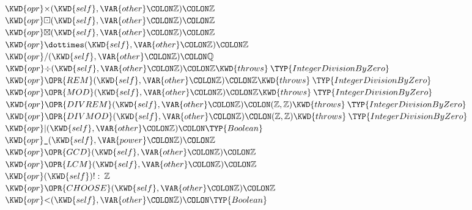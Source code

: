 \begin{Fortress}
\(  \KWD{opr} \mathord{\times}(\KWD{self}, \VAR{other}\COLON \mathbb{Z})\COLON \mathbb{Z}\)\\
\(  \KWD{opr} \mathord{\boxdot}(\KWD{self}, \VAR{other}\COLON \mathbb{Z})\COLON \mathbb{Z}\)\\
\(  \KWD{opr} \mathord{\boxtimes}(\KWD{self}, \VAR{other}\COLON \mathbb{Z})\COLON \mathbb{Z}\)\\
\(  \KWD{opr} \mathord{\dottimes}(\KWD{self}, \VAR{other}\COLON \mathbb{Z})\COLON \mathbb{Z}\)\\
\(  \KWD{opr} /(\KWD{self}, \VAR{other}\COLON \mathbb{Z})\COLON \mathbb{Q}\)\\
\(  \KWD{opr} \mathord{\div}(\KWD{self}, \VAR{other}\COLON \mathbb{Z})\COLON \mathbb{Z} \KWD{throws}\mskip 4mu plus 4mu\TYP{IntegerDivisionByZero}\)\\
\(  \KWD{opr} \mathord{\OPR{REM}}(\KWD{self}, \VAR{other}\COLON \mathbb{Z})\COLON \mathbb{Z} \KWD{throws}\mskip 4mu plus 4mu\TYP{IntegerDivisionByZero}\)\\
\(  \KWD{opr} \mathord{\OPR{MOD}}(\KWD{self}, \VAR{other}\COLON \mathbb{Z})\COLON \mathbb{Z} \KWD{throws}\mskip 4mu plus 4mu\TYP{IntegerDivisionByZero}\)\\
\(  \KWD{opr} \mathord{\OPR{DIVREM}}(\KWD{self}, \VAR{other}\COLON \mathbb{Z})\COLON (\mathbb{Z},\mathbb{Z}) \KWD{throws}\mskip 4mu plus 4mu\TYP{IntegerDivisionByZero}\)\\
\(  \KWD{opr} \mathord{\OPR{DIVMOD}}(\KWD{self}, \VAR{other}\COLON \mathbb{Z})\COLON (\mathbb{Z},\mathbb{Z}) \KWD{throws}\mskip 4mu plus 4mu\TYP{IntegerDivisionByZero}\)\\
\(  \KWD{opr} \mathord{\mid} (\KWD{self}, \VAR{other}\COLON \mathbb{Z})\COLON \TYP{Boolean}\)\\
\(  \KWD{opr} \mathord{\hbox{\tt\char'137}}(\KWD{self}, \VAR{power}\COLON \mathbb{Z})\COLON \mathbb{Z}\)\\
\(  \KWD{opr} \mathord{\OPR{GCD}}(\KWD{self}, \VAR{other}\COLON \mathbb{Z})\COLON \mathbb{Z}\)\\
\(  \KWD{opr} \mathord{\OPR{LCM}}(\KWD{self}, \VAR{other}\COLON \mathbb{Z})\COLON \mathbb{Z}\)\\
\(  \KWD{opr} (\KWD{self})! \mathrel{\mathtt{:}}\mskip 4mu plus 4mu\mathbb{Z}\)\\
\(  \KWD{opr} \mathord{\OPR{CHOOSE}}(\KWD{self}, \VAR{other}\COLON \mathbb{Z})\COLON \mathbb{Z}\)\\
\(  \KWD{opr} \mathord{<}(\KWD{self}, \VAR{other}\COLON \mathbb{Z})\COLON \TYP{Boolean}\)\\

\end{Fortress}
